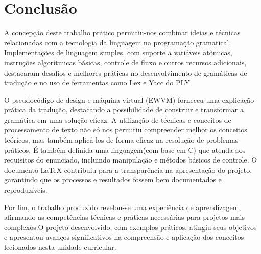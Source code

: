 \documentclass[12pt,a4paper]{report}
\begin{document}
\chapter{Conclus\~{a}o}
A concepção deste trabalho prático permitiu-nos combinar ideias e técnicas relacionadas com a tecnologia da linguagem na programação gramatical. Implementações de linguagem simples, com suporte a variáveis atômicas, instruções algorítmicas básicas, controle de fluxo e outros recursos adicionais, destacaram desafios e melhores práticas no desenvolvimento de gramáticas de tradução e no uso de ferramentas como Lex e Yacc do PLY.

O pseudocódigo de design e máquina virtual (EWVM) forneceu uma explicação prática da tradução, destacando a possibilidade de construir e transformar a gramática em uma solução eficaz. A utilização de técnicas e conceitos de processamento de texto não só nos permitiu compreender melhor os conceitos teóricos, mas também aplicá-los de forma eficaz na resolução de problemas práticos. É também definida uma linguagem(com base em C) que atenda aos requisitos do enunciado, incluindo manipulação e métodos básicos de controle. O documento LaTeX contribuiu para a transparência na apresentação do projeto, garantindo que os processos e resultados fossem bem documentados e reproduzíveis.

Por fim, o trabalho produzido revelou-se uma experiência de aprendizagem, afirmando as competências técnicas e práticas necessárias para projetos mais complexos.O projeto desenvolvido, com exemplos práticos, atingiu seus objetivos e apresentou avanços significativos na compreensão e aplicação dos conceitos lecionados nesta unidade curricular.
\end{document}
